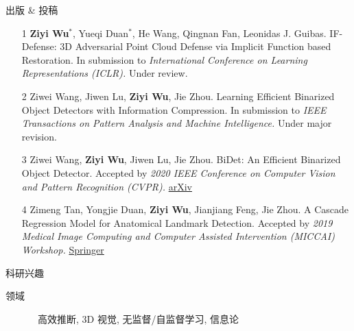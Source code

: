 \documentclass{resume} %
\begin{document}
\begin{rSection}{出版 \& 投稿}

\begin{enumerate}
\item[1] \textbf{Ziyi Wu}$^{*}$, Yueqi Duan$^{*}$, He Wang, Qingnan Fan, Leonidas J. Guibas. IF-Defense: 3D Adversarial Point Cloud Defense via Implicit Function based Restoration. In submission to \textit{International Conference on Learning Representations (ICLR).} Under review.
\item[2] Ziwei Wang, Jiwen Lu, \textbf{Ziyi Wu}, Jie Zhou. Learning Efficient Binarized Object Detectors with Information Compression. In submission to \textit{IEEE Transactions on Pattern Analysis and Machine Intelligence.} Under major revision.
\item[3] Ziwei Wang, \textbf{Ziyi Wu}, Jiwen Lu, Jie Zhou. BiDet: An Efficient Binarized Object Detector. Accepted by \textit{2020 IEEE Conference on Computer Vision and Pattern Recognition (CVPR).} \href{https://arxiv.org/abs/2003.03961}{arXiv}
\item[4] Zimeng Tan, Yongjie Duan, \textbf{Ziyi Wu}, Jianjiang Feng, Jie Zhou. A Cascade Regression Model for Anatomical Landmark Detection. Accepted by \textit{2019 Medical Image Computing and Computer Assisted Intervention (MICCAI) Workshop.} \href{https://link.springer.com/chapter/10.1007/978-3-030-39074-7_5}{Springer}
\end{enumerate}

\end{rSection}

\begin{rSection}{科研兴趣}

\begin{description}
    \item[领域] \quad\quad\, 
    高效推断, 
    3D 视觉, %
    无监督/自监督学习, 
    信息论
\end{description}

\end{rSection}
\end{document}
